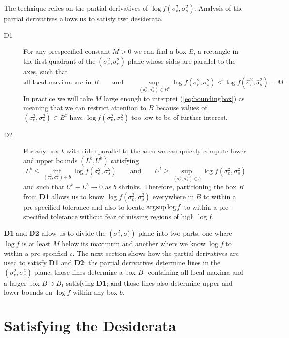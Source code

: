 \documentclass{report}
\newcommand{\RL}{f}
\newcommand{\logRL}{\log\RL}
\newcommand{\sigssq}{\sigma_s^2}
\newcommand{\sigesq}{\sigma_e^2}
\newcommand{\sshat}{\hat\sigma^2_e,\hat\sigma^2_s}
\newcommand{\logRLss}{\logRL(\sigesq,\sigssq)}
\newcommand{\argsup}{\operatornamewithlimits{argsup}}
\begin{document}
The technique relies on the partial derivatives of $\logRLss$.  Analysis of the partial derivatives allows us to satisfy two desiderata.
\begin{description}
\item[D1] For any prespecified constant $M>0$ we can find a box $B$, a rectangle in the first quadrant of the $(\sigssq, \sigesq)$ plane whose sides are parallel to the axes, such that
\begin{equation}
\label{eq:boundingbox}
	\text{all local maxima are in $B$} \qquad \text{and} \qquad \sup_{(\sigesq, \sigssq) \in B^c} \logRLss \le \logRL(\sshat) - M.
\end{equation}
In practice we will take $M$ large enough to interpret (\ref{eq:boundingbox}) as meaning that we can restrict attention to $B$ because values of $(\sigesq, \sigssq) \in B^c$ have $\logRLss$ too low to be of further interest.

\item[D2] For any box $b$ with sides parallel to the axes we can quickly compute lower and upper bounds $(L^b,U^b)$ satisfying
\begin{equation*}
  L^b \le \inf_{(\sigesq, \sigssq) \in b}\logRLss \qquad\text{and}\qquad
  U^b \ge \sup_{(\sigesq, \sigssq) \in b}\logRLss
\end{equation*}
and such that $U^b-L^b \rightarrow 0$ as $b$ shrinks.  Therefore, partitioning the box $B$ from \textbf{D1} allows us to know $\logRLss$ everywhere in $B$ to within a pre-specified tolerance and also to locate $\argsup\logRL$ to within a pre-specified tolerance without fear of missing regions of high $\logRL$.
\end{description}
\textbf{D1} and \textbf{D2} allow us to divide the $(\sigesq,\sigssq)$ plane into two parts: one where $\logRL$ is at least $M$ below its maximum and another where we know $\logRL$ to within a pre-specified $\epsilon$.  The next section shows how the partial derivatives are used to satisfy \textbf{D1} and \textbf{D2}: the partial derivatives determine lines in the $(\sigesq,\sigssq)$ plane; those lines determine a box $B_1$ containing all local maxima and a larger box $B \supset B_1$ satisfying \textbf{D1}; and those lines also determine upper and lower bounds on $\logRL$ within any box $b$.

\section{Satisfying the Desiderata}
\end{document}
